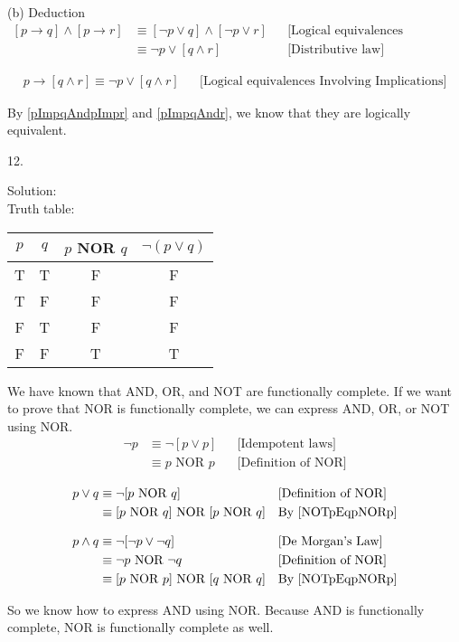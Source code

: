 \documentclass[12pt]{article}
\begin{document}
\indent (b) Deduction\\
\begin{align}
\label{pImpqAndpImpr}
[p \to q] \land [p \to r] &\equiv [\lnot p \lor q] \land [\lnot p \lor r]  && \text{[Logical equivalences Involving Implications]}\\
                          &\equiv \lnot p \lor [q \land r] && \text{[Distributive law]} 
\end{align}

\begin{align}
\label{pImpqAndr}
p \to [q \land r] \equiv \lnot p \lor [q\land r] && \text{[Logical equivalences Involving Implications]}
\end{align}

By \ref{pImpqAndpImpr} and \ref{pImpqAndr}, we know that they are logically equivalent.
\newline

12. 

\indent Solution:\\
\indent Truth table:\\
\begin{center}
\begin{tabular}{c|c|c|c}
    $p$ & $q$ & $p $ NOR $ q$ & $\lnot (p \lor q)$ \\
\hline
T & T & F & F\\
T & F & F & F\\
F & T & F & F\\
F & F & T & T
\end{tabular}
\end{center}

\indent We have known that AND, OR, and NOT are functionally complete. If we want to prove that NOR is functionally complete, we can express AND, OR, or NOT using NOR.\\

\begin{align}
\lnot p & \equiv \lnot [p \lor p] && \text{[Idempotent laws]}\\
        \label{NOTpEqpNORp}
        & \equiv p \text{ NOR } p && \text{[Definition of NOR]}
\end{align}

\begin{align}
p \lor q & \equiv \lnot [p \text{ NOR } q] && \text{[Definition of NOR]} \\
         & \equiv [p \text{ NOR } q] \text{ NOR } [p \text{ NOR } q] && \text{By \ref{NOTpEqpNORp}}
\end{align}

\begin{align}
p \land q & \equiv \lnot [\lnot p \lor \lnot q] && \text{[De Morgan's Law]} \\
          & \equiv \lnot p \text{ NOR } \lnot q && \text{[Definition of NOR]}\\
          & \equiv [p \text{ NOR } p] \text{ NOR } [q \text{ NOR } q] &&       \text{By \ref{NOTpEqpNORp}} 
\end{align}

\indent So we know how to express AND using NOR. Because AND is functionally complete, NOR is functionally complete as well. \\
\end{document}
